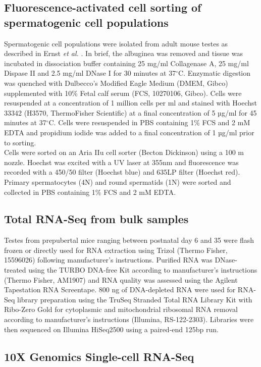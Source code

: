 \subsection{Fluorescence-activated cell sorting of spermatogenic cell populations }

Spermatogenic cell populations were isolated from adult mouse testes as described in Ernst \emph{et al.} \citep{Ernst2016}. In brief, the albuginea was removed and tissue was incubated in dissociation buffer containing 25 mg/ml Collagenase A, 25 mg/ml Dispase II and 2.5 mg/ml DNase I for 30 minutes at 37$^\circ$C. Enzymatic digestion was quenched with Dulbecco’s Modified Eagle Medium (DMEM, Gibco) supplemented with 10\% Fetal calf serum (FCS, 10270106, Gibco). Cells were resuspended at a concentration of 1 million cells per ml and stained with Hoechst 33342 (H3570, ThermoFisher Scientific) at a final concentration of 5 µg/ml for 45 minutes at 37$^\circ$C. Cells were resuspended in PBS containing 1\% FCS and 2 mM EDTA and propidium iodide was added to a final concentration of 1 µg/ml prior to sorting. \\
Cells were sorted on an Aria IIu cell sorter (Becton Dickinson) using a 100 \textmu{}m nozzle. Hoechst was excited with a UV laser at 355nm and fluorescence was recorded with a 450/50 filter (Hoechst blue) and 635LP filter (Hoechst red). Primary spermatocytes (4N) and round spermatids (1N) were sorted and collected in PBS containing 1\% FCS and 2 mM EDTA. 

\subsection{Total RNA-Seq from bulk samples}

Testes from prepubertal mice ranging between postnatal day 6 and 35 were flash frozen or directly used for RNA extraction using Trizol (Thermo Fisher, 15596026) following manufacturer’s instructions. Purified RNA was DNase-treated using the TURBO DNA-free Kit according to manufacturer’s instructions (Thermo Fisher, AM1907) and RNA quality was assessed using the Agilent Tapestation RNA Screentape. 800 ng of DNA-depleted RNA were used for RNA-Seq library preparation using the TruSeq Stranded Total RNA Library Kit with Ribo-Zero Gold for cytoplasmic and mitochondrial ribosomal RNA removal according to manufacturer’s instructions (Illumina, RS-122-2303). Libraries were then sequenced on Illumina HiSeq2500 using a paired-end 125bp run. 

\subsection{10X Genomics Single-cell RNA-Seq}

